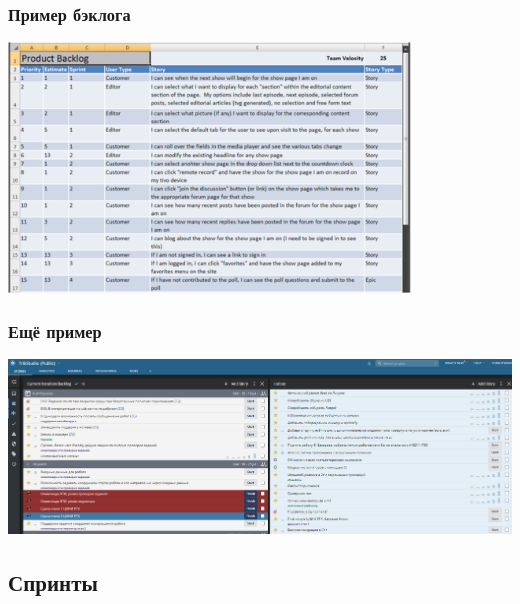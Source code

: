 \documentclass{../../slides-style}
\begin{document}
    \begin{frame}
        \frametitle{Пример бэклога}
        \begin{center}
            \includegraphics[width=0.8\textwidth]{backlog-1.png}
        \end{center}
    \end{frame}

    \begin{frame}
        \frametitle{Ещё пример}
        \begin{center}
            \includegraphics[width=1\textwidth]{backlog-2.png}
        \end{center}
    \end{frame}

    \subsection{Спринты}
\end{document}

